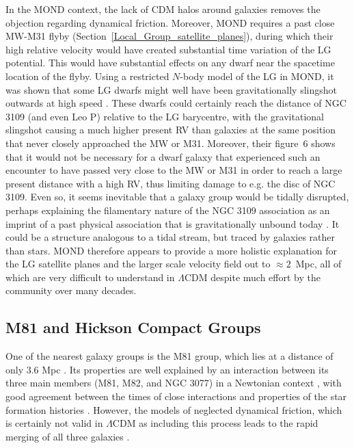 \documentclass[fleqn,usenatbib,useAMS]{mnras} %
\begin{document}
In the MOND context, the lack of CDM halos around galaxies removes the objection regarding dynamical friction. Moreover, MOND requires a past close MW-M31 flyby (Section~\ref{Local_Group_satellite_planes}), during which their high relative velocity would have created substantial time variation of the LG potential. This would have substantial effects on any dwarf near the spacetime location of the flyby. Using a restricted $N$-body model of the LG in MOND, it was shown that some LG dwarfs might well have been gravitationally slingshot outwards at high speed \citep{Banik_2018_anisotropy}. These dwarfs could certainly reach the distance of NGC 3109 (and even Leo P) relative to the LG barycentre, with the gravitational slingshot causing a much higher present RV than galaxies at the same position that never closely approached the MW or M31. Moreover, their figure~6 shows that it would not be necessary for a dwarf galaxy that experienced such an encounter to have passed very close to the MW or M31 in order to reach a large present distance with a high RV, thus limiting damage to e.g. the disc of NGC 3109. Even so, it seems inevitable that a galaxy group would be tidally disrupted, perhaps explaining the filamentary nature of the NGC 3109 association \citep{Bellazzini_2013} as an imprint of a past physical association that is gravitationally unbound today \citep{Kourkchi_2017}. It could be a structure analogous to a tidal stream, but traced by galaxies rather than stars. MOND therefore appears to provide a more holistic explanation for the LG satellite planes and the larger scale velocity field out to $\approx 2$~Mpc, all of which are very difficult to understand in $\Lambda$CDM despite much effort by the community over many decades.



\subsection{M81 and Hickson Compact Groups}
\label{Hickson_Compact_Groups}

One of the nearest galaxy groups is the M81 group, which lies at a distance of only 3.6 Mpc \citep{Gerke_2011}. Its properties are well explained by an interaction between its three main members (M81, M82, and NGC 3077) in a Newtonian context \citep{Yun_1999}, with good agreement between the times of close interactions and properties of the star formation histories \citep{Rieke_1980}. However, the models of \citet{Yun_1999} neglected dynamical friction, which is certainly not valid in $\Lambda$CDM as including this process leads to the rapid merging of all three galaxies \citep*{Thomson_1999}.
\end{document}
